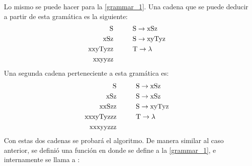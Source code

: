 Lo mismo se puede hacer para la \cref{grammar_1}. Una cadena que se puede deducir a partir de esta gramática es la siguiente:
\begin{equation*}
    \begin{split}
        \text{S} & \hspace{1cm} \text{S} \to \text{xSz} \\
        \text{xSz} & \hspace{1cm} \text{S} \to \text{xyTyz} \\
        \text{xxyTyzz} & \hspace{1cm} \text{T} \to \text{$\lambda$} \\
        \text{xxyyzz} & 
    \end{split}
\end{equation*}
Una segunda cadena perteneciente a esta gramática es:
\begin{equation*}
    \begin{split}
        \text{S} & \hspace{1cm} \text{S} \to \text{xSz} \\
        \text{xSz} & \hspace{1cm} \text{S} \to \text{xSz} \\
        \text{xxSzz} & \hspace{1cm} \text{S} \to \text{xyTyz} \\
        \text{xxxyTyzzz} & \hspace{1cm} \text{T} \to \text{$\lambda$} \\
        \text{xxxyyzzz} & 
    \end{split}
\end{equation*}
Con estas dos cadenas se probará el algoritmo. De manera similar al caso anterior, se definió una función  en donde se define a la \cref{grammar_1}, e internamente se llama a :
